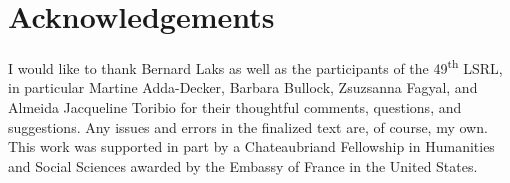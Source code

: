 \documentclass[output=paper,colorlinks,citecolor=brown,
]{langscibook}
\begin{document}
\section*{Acknowledgements}
I would like to thank Bernard Laks as well as the participants of the 49\textsuperscript{th} LSRL, in particular Martine Adda-Decker, Barbara Bullock, Zsuzsanna Fagyal, and Almeida Jacqueline Toribio for their thoughtful comments, questions, and suggestions. Any issues and errors in the finalized text are, of course, my own. This work was supported in part by a Chateaubriand Fellowship in Humanities and Social Sciences awarded by the Embassy of France in the United States.

\printbibliography[heading=subbibliography,notkeyword=this]
\end{document}
